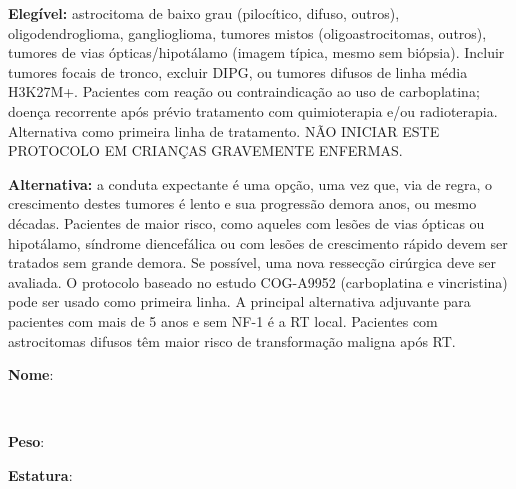 \documentclass[11pt,a4paper,oldfontcommands]{memoir}
\def\entrywithlabel[#1]#2{\parbox{#1}{{\small #2:} \hrulefill}}
\begin{document}
\textbf{Elegível:} astrocitoma de baixo grau (pilocítico, difuso, outros), oligodendroglioma, ganglioglioma, tumores mistos (oligoastrocitomas, outros), tumores de vias ópticas/hipotálamo (imagem típica, mesmo sem biópsia). Incluir tumores focais de tronco, excluir DIPG, ou tumores difusos de linha média H3K27M+. Pacientes com reação ou contraindicação ao uso de carboplatina; doença recorrente após prévio tratamento com quimioterapia e/ou radioterapia. Alternativa como primeira linha de tratamento. NÃO INICIAR ESTE PROTOCOLO EM CRIANÇAS GRAVEMENTE ENFERMAS.

\textbf{Alternativa:} a conduta expectante é uma opção, uma vez que, via de regra, o crescimento destes tumores é lento e sua progressão demora anos, ou mesmo décadas. Pacientes de maior risco, como aqueles com lesões de vias ópticas ou hipotálamo, síndrome diencefálica ou com lesões de crescimento rápido devem ser tratados sem grande demora. Se possível, uma nova ressecção cirúrgica deve ser avaliada. O protocolo baseado no estudo COG-A9952 (carboplatina e vincristina) pode ser usado como primeira linha. A principal alternativa adjuvante para pacientes com mais de 5 anos e sem NF-1 é a RT local. Pacientes com astrocitomas difusos têm maior risco de transformação maligna após RT.
\\[0.4cm]
\entrywithlabel[1\hsize]{\textbf{Nome}}\hfill
\\[0.3cm]
\entrywithlabel[.45\hsize]{\textbf{Peso}}\hfill  \entrywithlabel[.45\hsize]{\textbf{Estatura}}
\end{document}
